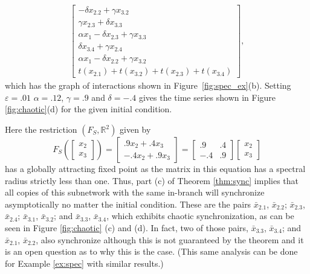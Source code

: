 \documentclass[12pt]{thesis}
\begin{document}
\begin{example}
\begin{align*}
\begin{bmatrix}
        -\delta x_{2.2} + \gamma x_{3.2} \\
        \gamma x_{2.3} + \delta x_{3.3} \\
        \alpha x_1 - \delta x_{2.3} + \gamma x_{3.3} \\
        \delta x_{3.4} + \gamma x_{2.4} \\
        \alpha x_1 - \delta x_{2.2} + \gamma x_{3.2} \\
        t(x_{2.1}) + t(x_{3.2}) + t(x_{2.3}) + t(x_{3.4})
    \end{bmatrix},
\end{align*}
which has the graph of interactions shown in Figure~\ref{fig:spec_ex}(b).
Setting $\varepsilon=.01$ $\alpha=.12$, $\gamma=.9$ and $\delta=-.4$ gives the time series shown in Figure \ref{fig:chaotic}(d) for the given initial condition.

Here the restriction $(F_S,\mathbb{R}^2)$ given by
\begin{equation*}
    F_S\left(\begin{bmatrix} x_2 \\ x_3 \end{bmatrix}\right) = \begin{bmatrix} .9x_2 + .4x_3 \\ -.4x_2 + .9x_3 \end{bmatrix} = \begin{bmatrix} .9 & .4 \\ -.4 & .9 \end{bmatrix}\begin{bmatrix} x_2 \\ x_3 \end{bmatrix}
\end{equation*}
has a globally attracting fixed point as the matrix in this equation has a spectral radius strictly less than one.
Thus, part (c) of Theorem \ref{thm:sync} implies that all copies of this subnetwork with the same in-branch will synchronize asymptotically no matter the initial condition.
These are the pairs $\bar{x}_{2.1}$, $\bar{x}_{2.2}$; $\bar{x}_{2.3}$, $\bar{x}_{2.4}$; $\bar{x}_{3.1}$, $\bar{x}_{3.2}$; and $\bar{x}_{3.3}$, $\bar{x}_{3.4}$, {which exhibits chaotic synchronization, as can be seen in Figure \ref{fig:chaotic} (c) and (d).
In fact, two of those pairs, $\bar{x}_{3.3}$, $\bar{x}_{3.4}$; and $\bar{x}_{2.1}$, $\bar{x}_{2.2}$, also synchronize although this is not guaranteed by the theorem and it is an open question as to why this is the case.} (This same analysis can be done for Example \ref{ex:spec} with similar results.)
 

\end{example}
\end{document}
